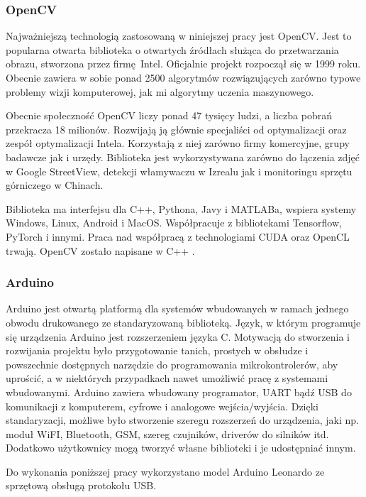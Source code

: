 \documentclass[12pt,twoside,polish]{article}
\begin{document}
\subsubsection{OpenCV}
Najważniejszą technologią zastosowaną w niniejszej pracy jest OpenCV. Jest to popularna otwarta biblioteka o otwartych źródłach służąca do przetwarzania obrazu, stworzona przez firmę Intel. Oficjalnie projekt rozpoczął się w 1999 roku. Obecnie zawiera w sobie  ponad 2500 algorytmów rozwiązujących zarówno typowe problemy wizji komputerowej, jak mi algorytmy uczenia maszynowego.

Obecnie społeczność OpenCV liczy ponad 47 tysięcy ludzi, a liczba pobrań przekracza 18 milionów. Rozwijają ją głównie specjaliści od optymalizacji oraz zespół optymalizacji Intela.  Korzystają z niej zarówno firmy komercyjne, grupy badawcze jak i urzędy. Biblioteka jest wykorzystywana zarówno do łączenia zdjęć w Google StreetView, detekcji włamywaczu w Izrealu jak i monitoringu sprzętu górniczego w Chinach.

Biblioteka ma interfejsu dla C++, Pythona, Javy i MATLABa, wspiera systemy Windows, Linux, Android i MacOS. Współpracuje z bibliotekami Tensorflow, PyTorch i innymi. Praca nad współpracą z technologiami CUDA oraz OpenCL trwają. OpenCV zostało napisane w C++ \cite{opencv}.

\subsubsection{Arduino}
Arduino jest otwartą platformą dla systemów wbudowanych w ramach jednego obwodu drukowanego ze standaryzowaną biblioteką. Język, w którym programuje się urządzenia Arduino jest rozszerzeniem języka C. Motywacją do stworzenia i rozwijania projektu było przygotowanie tanich, prostych w obsłudze i powszechnie dostępnych narzędzie do programowania mikrokontrolerów, aby uprościć, a w niektórych przypadkach nawet umożliwić pracę z systemami wbudowanymi. Arduino zawiera wbudowany programator, UART bądź USB do komunikacji z komputerem, cyfrowe i analogowe wejścia/wyjścia. Dzięki standaryzacji, możliwe było stworzenie szeregu rozszerzeń do urządzenia, jaki np. moduł WiFI, Bluetooth, GSM, szereg czujników, driverów do silników itd. Dodatkowo użytkownicy mogą tworzyć własne biblioteki i je udostępniać innym.

Do wykonania poniższej pracy wykorzystano model Arduino Leonardo ze sprzętową obsługą protokołu USB.

\end{document}
